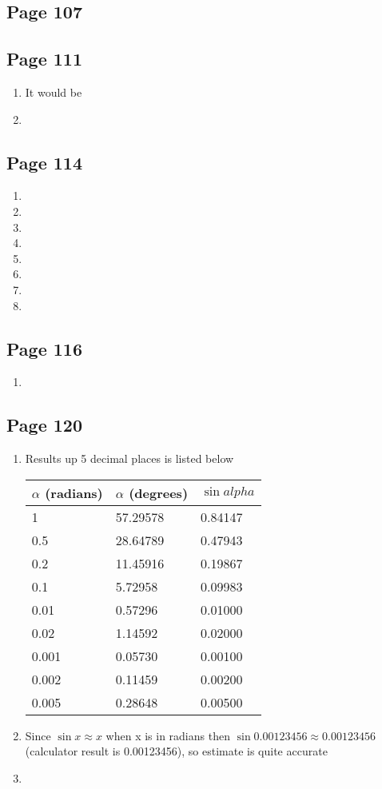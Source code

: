 \documentclass{article}
\newenvironment{solutions}[1]
{\subsection*{#1}
 \begin{enumerate}[leftmargin=1.5em]}
{\end{enumerate}}
\newcommand{\solution}{\item}
\newenvironment{subsolutions}
{\begin{enumerate}}
{\end{enumerate}}
\newcommand{\subsolution}{\item}
\begin{document}
\begin{solutions}{Page 107}
\begin{solutions}{Page 111}
\begin{subsolutions}
That is, irrational number divided by a rational number result in another irrational number (so we can't calculate a common multiply between 3 and $2\pi$)
\subsolution
It would be 

\subsolution

\end{subsolutions}

\end{solutions}

\begin{solutions}{Page 114}
\solution
\solution
\solution
\solution
\solution
\solution
\solution
\solution
\end{solutions}

\begin{solutions}{Page 116}
\solution
\end{solutions}

\begin{solutions}{Page 120}
\solution
Results up 5 decimal places is listed below
\begin{tabular}{|l|l|l|}
\hline
$\alpha$ (radians) & $\alpha$ (degrees)  & $\sin alpha$\\ \hline
1       & 57.29578 & 0.84147   \\ \hline
0.5     & 28.64789 & 0.47943   \\ \hline
0.2     & 11.45916 & 0.19867   \\ \hline
0.1     & 5.72958  & 0.09983   \\ \hline
0.01    & 0.57296  & 0.01000   \\ \hline
0.02    & 1.14592  & 0.02000   \\ \hline
0.001   & 0.05730  & 0.00100   \\ \hline
0.002   & 0.11459  & 0.00200   \\ \hline
0.005   & 0.28648  & 0.00500   \\ \hline
\end{tabular}

\solution
Since $\sin x \approx x$ when x is in radians then $\sin 0.00123456 \approx 0.00123456$ (calculator result is 0.00123456), so estimate is quite accurate

\solution
\begin{subsolutions}


\end{subsolutions}
\end{solutions}
\end{solutions}
\end{document}

